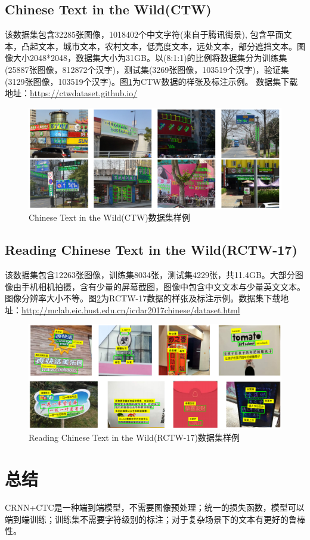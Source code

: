 \documentclass[12pt,a4paper]{ctexart}
\begin{document}
\subsection{Chinese Text in the Wild(CTW)}
该数据集包含32285张图像，1018402个中文字符(来自于腾讯街景), 包含平面文本，凸起文本，城市文本，农村文本，低亮度文本，远处文本，部分遮挡文本。图像大小2048*2048，数据集大小为31GB。以(8:1:1)的比例将数据集分为训练集(25887张图像，812872个汉字)，测试集(3269张图像，103519个汉字)，验证集(3129张图像，103519个汉字)。图\ref{fig:ctw-example}为CTW数据的样张及标注示例。
数据集下载地址：\url{https://ctwdataset.github.io/}
\begin{figure}[H]
	\centering
	\includegraphics[width=1\linewidth]{images/ctw_example}
	\caption{Chinese Text in the Wild(CTW)数据集样例}
	\label{fig:ctw-example}
\end{figure}
\subsection{Reading Chinese Text in the Wild(RCTW-17)}
该数据集包含12263张图像，训练集8034张，测试集4229张，共11.4GB。大部分图像由手机相机拍摄，含有少量的屏幕截图，图像中包含中文文本与少量英文文本。图像分辨率大小不等。图\ref{fig:rctw17_example}为RCTW-17数据的样张及标注示例。数据集下载地址：\url{http://mclab.eic.hust.edu.cn/icdar2017chinese/dataset.html}
\begin{figure}[H]
	\centering
	\includegraphics[width=1\linewidth]{images/rctw17_example}
	\caption{Reading Chinese Text in the Wild(RCTW-17)数据集样例}
	\label{fig:rctw17_example}
\end{figure}

\section{总结}
CRNN+CTC是一种端到端模型，不需要图像预处理；统一的损失函数，模型可以端到端训练；训练集不需要字符级别的标注；对于复杂场景下的文本有更好的鲁棒性。


\printbibliography[heading=bibliography,title=参考文献]
\end{document}
